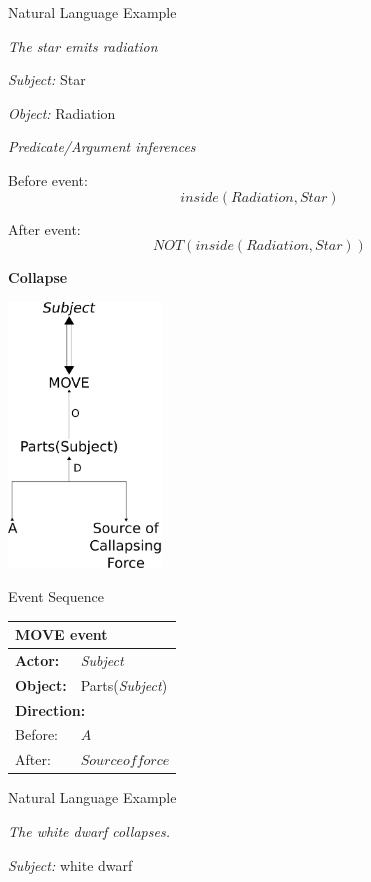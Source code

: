\documentclass[../dissertation]{subfiles}
\begin{document}
Natural Language Example

\textit{The star emits radiation}

\textit{Subject:} Star

\textit{Object:} Radiation

\bigskip
\textit{Predicate/Argument inferences}

Before event:
\[inside(Radiation, Star)\]

After event:
\[NOT(inside(Radiation, Star))\]

\newpage %

\textbf{Collapse}
\begin{center}
	\includegraphics[height=200pt]{collapse-cd.png}
\end{center}
	\bigskip
    
Event Sequence
\begin{center}
    \begin{tabular}{l l}
      \toprule
      \multicolumn{2}{l}{\textbf{MOVE event}}\\
      \hline
      \textbf{Actor:} & \textit{Subject}\\
      \textbf{Object:} & Parts(\textit{Subject})\\
      
      \multicolumn{2}{l}{\textbf{Direction:}} \\
      Before: & \(A\) \\
      After: & \(Source of force\) \\
      \bottomrule
    \end{tabular}
    
\end{center}

Natural Language Example

\textit{The white dwarf collapses.}

\textit{Subject:} white dwarf
\end{document}
